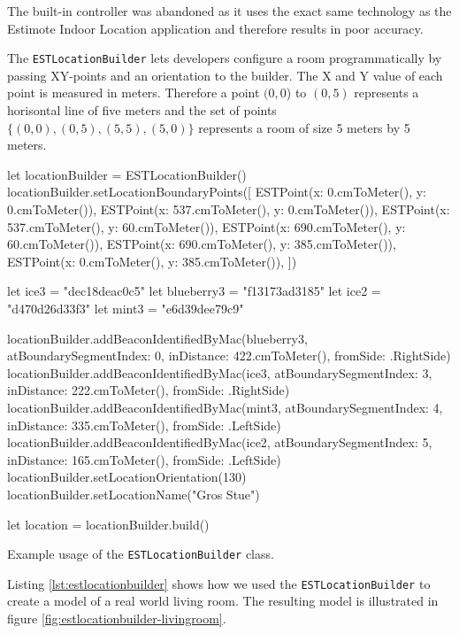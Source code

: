 The built-in controller was abandoned as it uses the exact same technology as the Estimote Indoor Location application and therefore results in poor accuracy.

The \texttt{ESTLocationBuilder} lets developers configure a room programmatically by passing XY-points and an orientation to the builder. The X and Y value of each point is measured in meters. Therefore a point $(0, 0$) to $(0, 5)$ represents a horisontal line of five meters and the set of points $\{(0,0),(0,5),(5,5),(5,0)\}$ represents a room of size 5 meters by 5 meters.

\begin{listing}
\begin{swiftcode}
        let locationBuilder = ESTLocationBuilder()
        locationBuilder.setLocationBoundaryPoints([
            ESTPoint(x: 0.cmToMeter(), y: 0.cmToMeter()),
            ESTPoint(x: 537.cmToMeter(), y: 0.cmToMeter()),
            ESTPoint(x: 537.cmToMeter(), y: 60.cmToMeter()),
            ESTPoint(x: 690.cmToMeter(), y: 60.cmToMeter()),
            ESTPoint(x: 690.cmToMeter(), y: 385.cmToMeter()),
            ESTPoint(x: 0.cmToMeter(), y: 385.cmToMeter()),
        ])
        
        let ice3 = "dec18deac0c5"
        let blueberry3 = "f13173ad3185"
        let ice2 = "d470d26d33f3"
        let mint3 = "e6d39dee79c9"
        
        locationBuilder.addBeaconIdentifiedByMac(blueberry3, atBoundarySegmentIndex: 0, inDistance: 422.cmToMeter(), fromSide: .RightSide)
        locationBuilder.addBeaconIdentifiedByMac(ice3, atBoundarySegmentIndex: 3, inDistance: 222.cmToMeter(), fromSide: .RightSide)
        locationBuilder.addBeaconIdentifiedByMac(mint3, atBoundarySegmentIndex: 4, inDistance: 335.cmToMeter(), fromSide: .LeftSide)
        locationBuilder.addBeaconIdentifiedByMac(ice2, atBoundarySegmentIndex: 5, inDistance: 165.cmToMeter(), fromSide: .LeftSide)
        locationBuilder.setLocationOrientation(130)
        locationBuilder.setLocationName("Gros Stue")
        
        let location = locationBuilder.build()
\end{swiftcode}
\caption{Example usage of the \texttt{ESTLocationBuilder} class.}
\label{lst:estlocationbuilder}
\end{listing}

Listing \ref{lst:estlocationbuilder} shows how we used the \texttt{ESTLocationBuilder} to create a model of a real world living room. The resulting model is illustrated in figure \ref{fig:estlocationbuilder-livingroom}.

